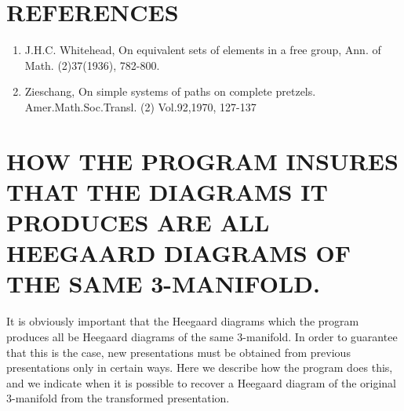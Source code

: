 \documentclass[12pt]{amsart}
\begin{document}
\section{REFERENCES}

\begin{enumerate}
\item      J.H.C. Whitehead, On equivalent sets of elements in a free group, Ann. of Math.
        (2)37(1936), 782-800.                                                   
\item     Zieschang, On simple systems of paths on complete pretzels. Amer.Math.Soc.Transl.
        (2) Vol.92,1970, 127-137
\end{enumerate}

              
 \section{HOW THE PROGRAM INSURES THAT THE DIAGRAMS IT PRODUCES ARE ALL HEEGAARD DIAGRAMS OF THE SAME 3-MANIFOLD.}

                
                It is obviously important that the Heegaard diagrams which the program produces
        all be Heegaard diagrams of the same 3-manifold. In order to guarantee that this is
        the case, new presentations must be obtained from previous presentations only in
        certain ways. Here we describe how the program does this, and we indicate when it is
        possible to recover a Heegaard diagram of the original 3-manifold from the
        transformed presentation.
        
\end{document}
